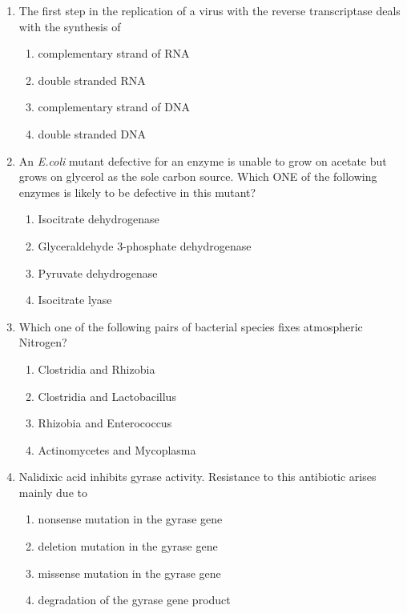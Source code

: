 \documentclass[journal,12pt,onecolumn]{IEEEtran}
\begin{document}
\begin{enumerate}[label=\arabic*.]
\item The first step in the replication of a virus with the reverse transcriptase deals with the synthesis of
\begin{multicols}{2}
\begin{enumerate}[label=(\Alph*)]
\item complementary strand of RNA
\item double stranded RNA
\item complementary strand of DNA
\item double stranded DNA
\end{enumerate}
\end{multicols}

\item An \textit{E.coli} mutant defective for an enzyme is unable to grow on acetate but grows on glycerol as the sole carbon source. Which ONE of the following enzymes is likely to be defective in this mutant?
\begin{enumerate}[label=(\Alph*)]
\item Isocitrate dehydrogenase
\item Glyceraldehyde 3-phosphate dehydrogenase
\item Pyruvate dehydrogenase
\item Isocitrate lyase
\end{enumerate}

\item Which one of the following pairs of bacterial species fixes atmospheric Nitrogen?
\begin{multicols}{2}
\begin{enumerate}[label=(\Alph*)]
\item Clostridia and Rhizobia
\item Clostridia and Lactobacillus
\item Rhizobia and Enterococcus
\item Actinomycetes and Mycoplasma
\end{enumerate}
\end{multicols}

\item Nalidixic acid inhibits gyrase activity. Resistance to this antibiotic arises mainly due to
\begin{enumerate}[label=(\Alph*)]
\item nonsense mutation in the gyrase gene
\item deletion mutation in the gyrase gene
\item missense mutation in the gyrase gene
\item degradation of the gyrase gene product
\end{enumerate}


\end{enumerate}
\end{document}
